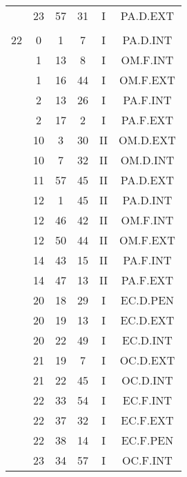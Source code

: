 \documentclass[12pt, a4paper]{article}
\begin{document}
\begin{multicols}{3}
{\begin{tabular}{c c c c c c}
	 	 	 	 & 23 & 57 & 31 & I & PA.D.EXT\\%
	 	 	 	 & & & & & \\%
	 	 	 	22 & 0 & 1 & 7 & I & PA.D.INT\\%
	 	 	 	 & 1 & 13 & 8 & I & OM.F.INT\\%
	 	 	 	 & 1 & 16 & 44 & I & OM.F.EXT\\%
	 	 	 	 & 2 & 13 & 26 & I & PA.F.INT\\%
	 	 	 	 & 2 & 17 & 2 & I & PA.F.EXT\\%
	 	 	 	 & 10 & 3 & 30 & II & OM.D.EXT\\%
	 	 	 	 & 10 & 7 & 32 & II & OM.D.INT\\%
	 	 	 	 & 11 & 57 & 45 & II & PA.D.EXT\\%
	 	 	 	 & 12 & 1 & 45 & II & PA.D.INT\\%
	 	 	 	 & 12 & 46 & 42 & II & OM.F.INT\\%
	 	 	 	 & 12 & 50 & 44 & II & OM.F.EXT\\%
	 	 	 	 & 14 & 43 & 15 & II & PA.F.INT\\%
	 	 	 	 & 14 & 47 & 13 & II & PA.F.EXT\\%
	 	 	 	 & 20 & 18 & 29 & I & EC.D.PEN\\%
	 	 	 	 & 20 & 19 & 13 & I & EC.D.EXT\\%
	 	 	 	 & 20 & 22 & 49 & I & EC.D.INT\\%
	 	 	 	 & 21 & 19 & 7 & I & OC.D.EXT\\%
	 	 	 	 & 21 & 22 & 45 & I & OC.D.INT\\%
	 	 	 	 & 22 & 33 & 54 & I & EC.F.INT\\%
	 	 	 	 & 22 & 37 & 32 & I & EC.F.EXT\\%
	 	 	 	 & 22 & 38 & 14 & I & EC.F.PEN\\%
	 	 	 	 & 23 & 34 & 57 & I & OC.F.INT\\%
	 	 \end{tabular}
 	}
\end{multicols}
\end{document}
